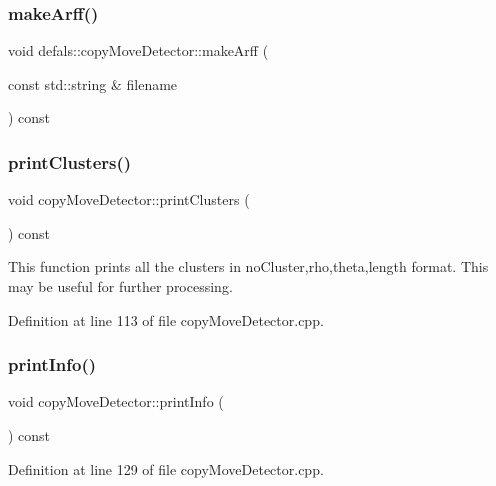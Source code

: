 \subsubsection{\texorpdfstring{make\+Arff()}{makeArff()}}
{\footnotesize\ttfamily void defals\+::copy\+Move\+Detector\+::make\+Arff (\begin{DoxyParamCaption}\item[{const std\+::string \&}]{filename }\end{DoxyParamCaption}) const}

\mbox{\label{classdefals_1_1copy_move_detector_a397e6715d0a274c67ed81735da36329f}} 
\subsubsection{\texorpdfstring{print\+Clusters()}{printClusters()}}
{\footnotesize\ttfamily void copy\+Move\+Detector\+::print\+Clusters (\begin{DoxyParamCaption}{ }\end{DoxyParamCaption}) const}

This function prints all the clusters in no\+Cluster,rho,theta,length format. This may be useful for further processing. 

Definition at line 113 of file copy\+Move\+Detector.\+cpp.

\mbox{\label{classdefals_1_1copy_move_detector_a9fd2ba369ce7ab6fb7f5a7b9c23f4eae}} 
\subsubsection{\texorpdfstring{print\+Info()}{printInfo()}}
{\footnotesize\ttfamily void copy\+Move\+Detector\+::print\+Info (\begin{DoxyParamCaption}{ }\end{DoxyParamCaption}) const}



Definition at line 129 of file copy\+Move\+Detector.\+cpp.

